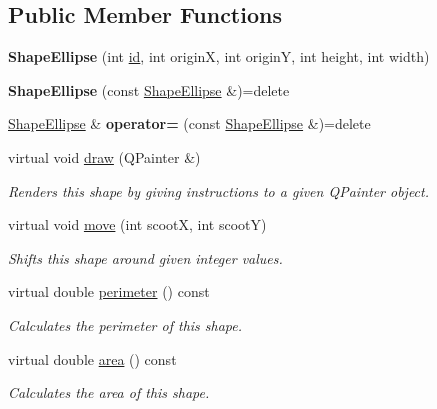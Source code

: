 \subsection*{Public Member Functions}
\begin{DoxyCompactItemize}
\item 
\mbox{\label{class_shape_ellipse_a1af11a6558299f353a2de67e20707c42}} 
{\bfseries Shape\+Ellipse} (int \mbox{\hyperlink{class_i_shape_a6ff2d631831c1079b88eeebc8ac65bb0}{id}}, int originX, int originY, int height, int width)
\item 
\mbox{\label{class_shape_ellipse_a681b89e97838504d2c7f6c1771055b2e}} 
{\bfseries Shape\+Ellipse} (const \mbox{\hyperlink{class_shape_ellipse}{Shape\+Ellipse}} \&)=delete
\item 
\mbox{\label{class_shape_ellipse_ad9859459d9f53eac418601c054cf3289}} 
\mbox{\hyperlink{class_shape_ellipse}{Shape\+Ellipse}} \& {\bfseries operator=} (const \mbox{\hyperlink{class_shape_ellipse}{Shape\+Ellipse}} \&)=delete
\item 
virtual void \mbox{\hyperlink{class_shape_ellipse_ac7f0a33cb5a88c6956f2d876c0c5d313}{draw}} (Q\+Painter \&)
\begin{DoxyCompactList}\small\item\em Renders this shape by giving instructions to a given Q\+Painter object. \end{DoxyCompactList}\item 
virtual void \mbox{\hyperlink{class_shape_ellipse_a07ce6783744d01ccebbd5c2c8b4c7d9b}{move}} (int scootX, int scootY)
\begin{DoxyCompactList}\small\item\em Shifts this shape around given integer values. \end{DoxyCompactList}\item 
virtual double \mbox{\hyperlink{class_shape_ellipse_a397c01c912105854e065f6c2d766f73a}{perimeter}} () const
\begin{DoxyCompactList}\small\item\em Calculates the perimeter of this shape. \end{DoxyCompactList}\item 
virtual double \mbox{\hyperlink{class_shape_ellipse_a08287b301b7501eb941805eaf85fc00c}{area}} () const
\begin{DoxyCompactList}\small\item\em Calculates the area of this shape. \end{DoxyCompactList}\end{DoxyCompactItemize}
